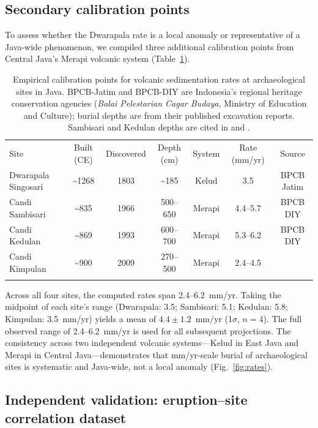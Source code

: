 \documentclass[egqsj, manuscript]{copernicus}
\begin{document}
\subsection{Secondary calibration points}

To assess whether the Dwarapala rate is a local anomaly or representative of a Java-wide phenomenon, we compiled three additional calibration points from Central Java's Merapi volcanic system (Table~\ref{tab:calibration}).

\begin{table}[t]
\caption{Empirical calibration points for volcanic sedimentation rates at archaeological sites in Java. BPCB-Jatim and BPCB-DIY are Indonesia's regional heritage conservation agencies (\textit{Balai Pelestarian Cagar Budaya}, Ministry of Education and Culture); burial depths are from their published excavation reports. Sambisari and Kedulan depths are cited in \citet{lavigne2000} and \citet{thouret2000}.}
\label{tab:calibration}
\begin{tabular}{lcccccc}
\tophline
Site & Built (CE) & Discovered & Depth (cm) & System & Rate (mm/yr) & Source \\
\middlehline
Dwarapala Singosari & \textasciitilde1268 & 1803 & \textasciitilde185 & Kelud & 3.5 & BPCB Jatim \\
Candi Sambisari & \textasciitilde835 & 1966 & 500--650 & Merapi & 4.4--5.7 & BPCB DIY \\
Candi Kedulan & \textasciitilde869 & 1993 & 600--700 & Merapi & 5.3--6.2 & BPCB DIY \\
Candi Kimpulan & \textasciitilde900 & 2009 & 270--500 & Merapi & 2.4--4.5 & \citet{putra2019} \\
\bottomhline
\end{tabular}
\belowtable{}
\end{table}

Across all four sites, the computed rates span 2.4--6.2~mm/yr. Taking the midpoint of each site's range (Dwarapala: 3.5; Sambisari: 5.1; Kedulan: 5.8; Kimpulan: 3.5~mm/yr) yields a mean of $4.4 \pm 1.2$~mm/yr (1$\sigma$, $n=4$). The full observed range of 2.4--6.2~mm/yr is used for all subsequent projections. The consistency across two independent volcanic systems---Kelud in East Java and Merapi in Central Java---demonstrates that mm/yr-scale burial of archaeological sites is systematic and Java-wide, not a local anomaly (Fig.~\ref{fig:rates}).

\subsection{Independent validation: eruption--site correlation dataset}
\end{document}
